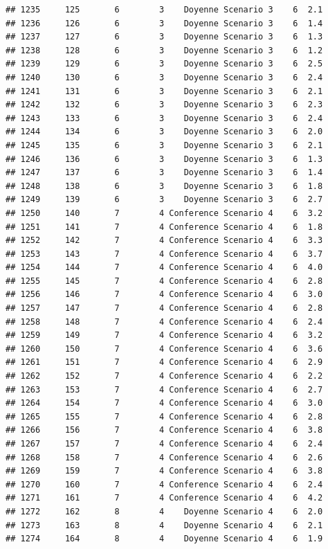 \documentclass[
]{article}
\begin{document}
\begin{verbatim}
## 1235     125       6        3    Doyenne Scenario 3    6  2.1
## 1236     126       6        3    Doyenne Scenario 3    6  1.4
## 1237     127       6        3    Doyenne Scenario 3    6  1.3
## 1238     128       6        3    Doyenne Scenario 3    6  1.2
## 1239     129       6        3    Doyenne Scenario 3    6  2.5
## 1240     130       6        3    Doyenne Scenario 3    6  2.4
## 1241     131       6        3    Doyenne Scenario 3    6  2.1
## 1242     132       6        3    Doyenne Scenario 3    6  2.3
## 1243     133       6        3    Doyenne Scenario 3    6  2.4
## 1244     134       6        3    Doyenne Scenario 3    6  2.0
## 1245     135       6        3    Doyenne Scenario 3    6  2.1
## 1246     136       6        3    Doyenne Scenario 3    6  1.3
## 1247     137       6        3    Doyenne Scenario 3    6  1.4
## 1248     138       6        3    Doyenne Scenario 3    6  1.8
## 1249     139       6        3    Doyenne Scenario 3    6  2.7
## 1250     140       7        4 Conference Scenario 4    6  3.2
## 1251     141       7        4 Conference Scenario 4    6  1.8
## 1252     142       7        4 Conference Scenario 4    6  3.3
## 1253     143       7        4 Conference Scenario 4    6  3.7
## 1254     144       7        4 Conference Scenario 4    6  4.0
## 1255     145       7        4 Conference Scenario 4    6  2.8
## 1256     146       7        4 Conference Scenario 4    6  3.0
## 1257     147       7        4 Conference Scenario 4    6  2.8
## 1258     148       7        4 Conference Scenario 4    6  2.4
## 1259     149       7        4 Conference Scenario 4    6  3.2
## 1260     150       7        4 Conference Scenario 4    6  3.6
## 1261     151       7        4 Conference Scenario 4    6  2.9
## 1262     152       7        4 Conference Scenario 4    6  2.2
## 1263     153       7        4 Conference Scenario 4    6  2.7
## 1264     154       7        4 Conference Scenario 4    6  3.0
## 1265     155       7        4 Conference Scenario 4    6  2.8
## 1266     156       7        4 Conference Scenario 4    6  3.8
## 1267     157       7        4 Conference Scenario 4    6  2.4
## 1268     158       7        4 Conference Scenario 4    6  2.6
## 1269     159       7        4 Conference Scenario 4    6  3.8
## 1270     160       7        4 Conference Scenario 4    6  2.4
## 1271     161       7        4 Conference Scenario 4    6  4.2
## 1272     162       8        4    Doyenne Scenario 4    6  2.0
## 1273     163       8        4    Doyenne Scenario 4    6  2.1
## 1274     164       8        4    Doyenne Scenario 4    6  1.9

\end{verbatim}
\end{document}
